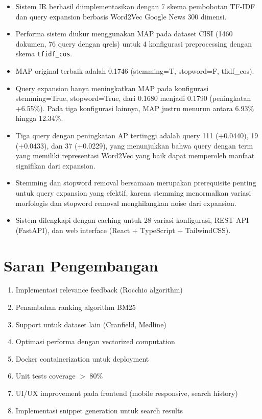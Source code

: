 \documentclass[12pt,a4paper]{report}
\begin{document}
\begin{itemize}
    \item Sistem IR berhasil diimplementasikan dengan 7 skema pembobotan TF-IDF dan query expansion berbasis Word2Vec Google News 300 dimensi.
    \item Performa sistem diukur menggunakan MAP pada dataset CISI (1460 dokumen, 76 query dengan qrels) untuk 4 konfigurasi preprocessing dengan skema \texttt{tfidf\_cos}.
    \item MAP original terbaik adalah 0.1746 (stemming=T, stopword=F, tfidf\_cos).
    \item Query expansion hanya meningkatkan MAP pada konfigurasi stemming=True, stopword=True, dari 0.1680 menjadi 0.1790 (peningkatan +6.55\%). Pada tiga konfigurasi lainnya, MAP justru menurun antara 6.93\% hingga 12.34\%.
    \item Tiga query dengan peningkatan AP tertinggi adalah query 111 (+0.0440), 19 (+0.0433), dan 37 (+0.0229), yang menunjukkan bahwa query dengan term yang memiliki representasi Word2Vec yang baik dapat memperoleh manfaat signifikan dari expansion.
    \item Stemming dan stopword removal bersamaan merupakan prerequisite penting untuk query expansion yang efektif, karena stemming menormalkan variasi morfologis dan stopword removal menghilangkan noise dari expansion.
    \item Sistem dilengkapi dengan caching untuk 28 variasi konfigurasi, REST API (FastAPI), dan web interface (React + TypeScript + TailwindCSS).
\end{itemize}

\section{Saran Pengembangan}
\begin{enumerate}
    \item Implementasi relevance feedback (Rocchio algorithm)
    \item Penambahan ranking algorithm BM25
    \item Support untuk dataset lain (Cranfield, Medline)
    \item Optimasi performa dengan vectorized computation
    \item Docker containerization untuk deployment
    \item Unit tests coverage $>$ 80\%
    \item UI/UX improvement pada frontend (mobile responsive, search history)
    \item Implementasi snippet generation untuk search results
\end{enumerate}
\end{document}
